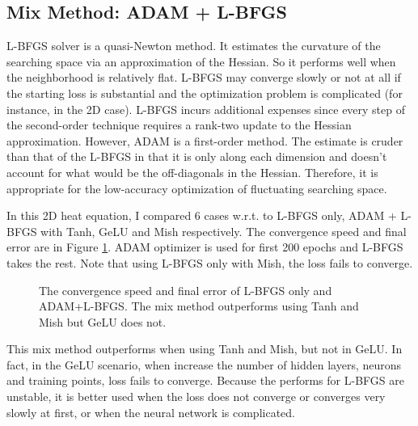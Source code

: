 \documentclass[11pt, a4paper]{article}
\begin{document}
    \newpage

    \subsection{Mix Method: ADAM + L-BFGS}

    L-BFGS solver is a quasi-Newton method. It estimates the curvature of the searching space via an approximation of the Hessian.
    So it performs well when the neighborhood is relatively flat. 
    L-BFGS may converge slowly or not at all if the starting loss is substantial and the optimization problem is complicated (for instance, in the 2D case).
    L-BFGS incurs additional expenses since every step of the second-order technique requires a rank-two update to the Hessian approximation.
    However, ADAM is a first-order method. The estimate is cruder than that of the L-BFGS in that it is only along each dimension and doesn't account for what would be the off-diagonals in the Hessian.
    Therefore, it is appropriate for the low-accuracy optimization of fluctuating searching space.

    In this 2D heat equation, I compared 6 cases w.r.t. to L-BFGS only, ADAM + L-BFGS with Tanh, GeLU and Mish respectively. The convergence speed and final error are in Figure \ref{fig:al}.
    ADAM optimizer is used for first 200 epochs and L-BFGS takes the rest. Note that using L-BFGS only with Mish, the loss fails to converge.

    \begin{figure}[htb]
        \caption{The convergence speed and final error of L-BFGS only and ADAM+L-BFGS. The mix method outperforms using Tanh and Mish but GeLU does not.}
        \label{fig:al}
    \end{figure}

    This mix method outperforms when using Tanh and Mish, but not in GeLU. 
    In fact, in the GeLU scenario, when increase the number of hidden layers, neurons and training points, loss fails to converge. 
    Because the performs for L-BFGS are unstable, it is better used when the loss does not converge or converges very slowly at first, or when the neural network is complicated. 
\end{document}
